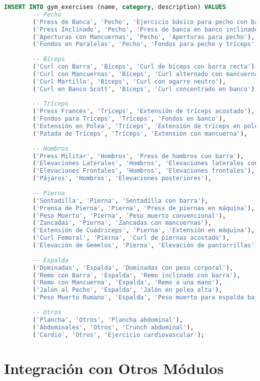 \documentclass[12pt,a4paper]{article}
\begin{document}
	\begin{lstlisting}[language=SQL, caption=Ejercicios por defecto]
		INSERT INTO gym_exercises (name, category, description) VALUES
		-- Pecho
		('Press de Banca', 'Pecho', 'Ejercicio básico para pecho con barra'),
		('Press Inclinado', 'Pecho', 'Press de banca en banco inclinado'),
		('Aperturas con Mancuernas', 'Pecho', 'Aperturas para pecho'),
		('Fondos en Paralelas', 'Pecho', 'Fondos para pecho y tríceps'),
		
		-- Bíceps
		('Curl con Barra', 'Bíceps', 'Curl de bíceps con barra recta'),
		('Curl con Mancuernas', 'Bíceps', 'Curl alternado con mancuernas'),
		('Curl Martillo', 'Bíceps', 'Curl con agarre neutro'),
		('Curl en Banco Scott', 'Bíceps', 'Curl concentrado en banco'),
		
		-- Tríceps
		('Press Francés', 'Tríceps', 'Extensión de tríceps acostado'),
		('Fondos para Tríceps', 'Tríceps', 'Fondos en banco'),
		('Extensión en Polea', 'Tríceps', 'Extensión de tríceps en polea alta'),
		('Patada de Tríceps', 'Tríceps', 'Extensión con mancuerna'),
		
		-- Hombros
		('Press Militar', 'Hombros', 'Press de hombros con barra'),
		('Elevaciones Laterales', 'Hombros', 'Elevaciones laterales con mancuernas'),
		('Elevaciones Frontales', 'Hombros', 'Elevaciones frontales'),
		('Pájaros', 'Hombros', 'Elevaciones posteriores'),
		
		-- Pierna
		('Sentadilla', 'Pierna', 'Sentadilla con barra'),
		('Prensa de Pierna', 'Pierna', 'Press de piernas en máquina'),
		('Peso Muerto', 'Pierna', 'Peso muerto convencional'),
		('Zancadas', 'Pierna', 'Zancadas con mancuernas'),
		('Extensión de Cuádriceps', 'Pierna', 'Extensión en máquina'),
		('Curl Femoral', 'Pierna', 'Curl de piernas acostado'),
		('Elevación de Gemelos', 'Pierna', 'Elevación de pantorrillas'),
		
		-- Espalda
		('Dominadas', 'Espalda', 'Dominadas con peso corporal'),
		('Remo con Barra', 'Espalda', 'Remo inclinado con barra'),
		('Remo con Mancuerna', 'Espalda', 'Remo a una mano'),
		('Jalón al Pecho', 'Espalda', 'Jalón en polea alta'),
		('Peso Muerto Rumano', 'Espalda', 'Peso muerto para espalda baja'),
		
		-- Otros
		('Plancha', 'Otros', 'Plancha abdominal'),
		('Abdominales', 'Otros', 'Crunch abdominal'),
		('Cardio', 'Otros', 'Ejercicio cardiovascular');
	\end{lstlisting}
	
	\section{Integración con Otros Módulos}
	
\end{document}
